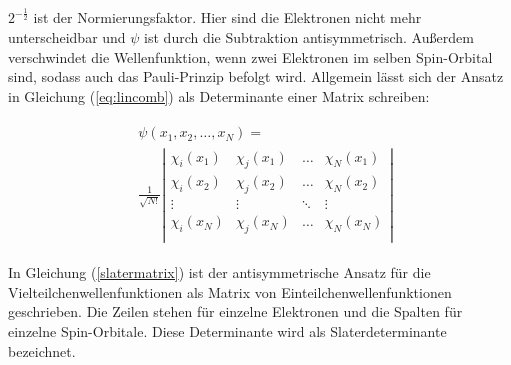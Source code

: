 $2^{-\frac{1}{2}}$ ist der Normierungsfaktor.
Hier sind die Elektronen nicht mehr unterscheidbar und $\psi$ ist durch die Subtraktion antisymmetrisch. Außerdem verschwindet die Wellenfunktion, wenn zwei Elektronen im selben Spin-Orbital sind, sodass auch das Pauli-Prinzip befolgt wird. Allgemein lässt sich der Ansatz in Gleichung (\ref{eq:lincomb}) als Determinante einer Matrix schreiben: \cite{Szabo_Ostlund96}

\begin{align}
\label{slatermatrix}
\begin{split}
& \psi(x_1,x_2,\dots,x_N) =\\
& \frac{1}{\sqrt{N!}}\left|\begin{matrix}
\chi_i(x_1) & \chi_j(x_1) & \dots & \chi_N(x_1)\\
\chi_i(x_2) & \chi_j(x_2) & \dots & \chi_N(x_2)\\
\vdots&\vdots&\ddots&\vdots\\
\chi_i(x_N) & \chi_j(x_N) & \dots & \chi_N(x_N)\\
\end{matrix}\right|
\end{split}
\end{align}

In Gleichung (\ref{slatermatrix}) ist der antisymmetrische Ansatz für die Vielteilchenwellenfunktionen als Matrix von Einteilchenwellenfunktionen geschrieben. 
Die Zeilen stehen für einzelne Elektronen und die Spalten für einzelne Spin-Orbitale. Diese Determinante wird als Slaterdeterminante bezeichnet.

% 
